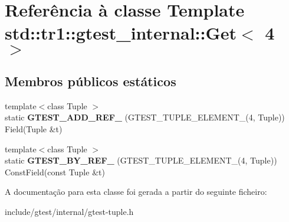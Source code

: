 \hypertarget{classstd_1_1tr1_1_1gtest__internal_1_1Get_3_014_01_4}{\section{Referência à classe Template std\-:\-:tr1\-:\-:gtest\-\_\-internal\-:\-:Get$<$ 4 $>$}
\label{classstd_1_1tr1_1_1gtest__internal_1_1Get_3_014_01_4}
}
\subsection*{Membros públicos estáticos}
\begin{DoxyCompactItemize}
\item 
\hypertarget{classstd_1_1tr1_1_1gtest__internal_1_1Get_3_014_01_4_a5c7a91c681118bb7253e305f8ff42be4}{{\footnotesize template$<$class Tuple $>$ }\\static {\bfseries G\-T\-E\-S\-T\-\_\-\-A\-D\-D\-\_\-\-R\-E\-F\-\_\-} (G\-T\-E\-S\-T\-\_\-\-T\-U\-P\-L\-E\-\_\-\-E\-L\-E\-M\-E\-N\-T\-\_\-(4, Tuple)) Field(Tuple \&t)}\label{classstd_1_1tr1_1_1gtest__internal_1_1Get_3_014_01_4_a5c7a91c681118bb7253e305f8ff42be4}

\item 
\hypertarget{classstd_1_1tr1_1_1gtest__internal_1_1Get_3_014_01_4_a04794c398bbe81e4de0915b79da2166a}{{\footnotesize template$<$class Tuple $>$ }\\static {\bfseries G\-T\-E\-S\-T\-\_\-\-B\-Y\-\_\-\-R\-E\-F\-\_\-} (G\-T\-E\-S\-T\-\_\-\-T\-U\-P\-L\-E\-\_\-\-E\-L\-E\-M\-E\-N\-T\-\_\-(4, Tuple)) Const\-Field(const Tuple \&t)}\label{classstd_1_1tr1_1_1gtest__internal_1_1Get_3_014_01_4_a04794c398bbe81e4de0915b79da2166a}

\end{DoxyCompactItemize}


A documentação para esta classe foi gerada a partir do seguinte ficheiro\-:\begin{DoxyCompactItemize}
\item 
include/gtest/internal/gtest-\/tuple.\-h\end{DoxyCompactItemize}
